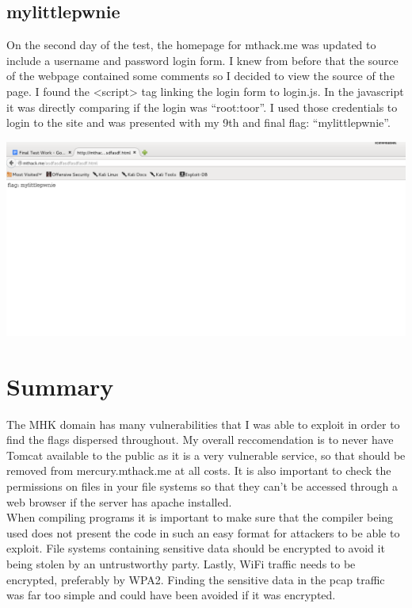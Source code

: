 \documentclass[12pt]{report}
\newcommand{\mychapter}[2]{
    \setcounter{chapter}{#1}
    \setcounter{section}{0}
    \chapter*{#2}
    \addcontentsline{toc}{chapter}{#2}
}
\begin{document}
\section{mylittlepwnie}
On the second day of the test, the homepage for mthack.me was updated to include a username and password login form. I knew from before that the source of the webpage contained some comments so I decided to view the source of the page. I found the <script> tag linking the login form to login.js. In the javascript it was directly comparing if the login was ``root:toor''. I used those credentials to login to the site and was presented with my 9th and final flag: ``mylittlepwnie''.\\
\newline
\begin{center}
\includegraphics[scale=0.33]{mylittlepwnie.png}
\end{center}

\mychapter{7}{Summary}
The MHK domain has many vulnerabilities that I was able to exploit in order to find the flags dispersed throughout. My overall reccomendation is to never have Tomcat available to the public as it is a very vulnerable service, so that should be removed from mercury.mthack.me at all costs. It is also important to check the permissions on files in your file systems so that they can't be accessed through a web browser if the server has apache installed.\\
\newline
When compiling programs it is important to make sure that the compiler being used does not present the code in such an easy format for attackers to be able to exploit. File systems containing sensitive data should be encrypted to avoid it being stolen by an untrustworthy party. Lastly, WiFi traffic needs to be encrypted, preferably by WPA2. Finding the sensitive data in the pcap traffic was far too simple and could have been avoided if it was encrypted.
\clearpage

{}

\end{document}
